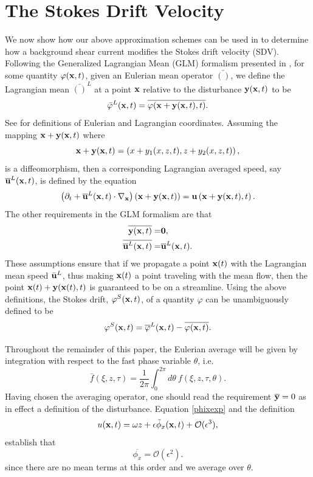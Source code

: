 \documentclass{JFM_Style/jfm}
\newcommand{\pd}{\partial}
\begin{document}
\section{The Stokes Drift Velocity}
We now show how our above approximation schemes can be used in to determine how a background shear current modifies the Stokes drift velocity (SDV). Following the Generalized Lagrangian Mean (GLM) formalism presented in \cite{andrews}, for some quantity $\varphi({\bf x},t)$, given an
Eulerian mean operator $\bar{()}$, we define the Lagrangian mean $\bar{()}^{L}$ at a point ${\bf x}$ relative to the disturbance ${\bf y}({\bf x},t)$ to be  
\[
\bar{\varphi}^{L}({\bf x},t) = \overline{\varphi({\bf x}+{\bf y}({\bf x},t),t)}.
\]
See \cite{kundu} for definitions of Eulerian and Lagrangian coordinates.  Assuming the mapping ${\bf x} + {\bf y}({\bf x},t)$ where
\[
{\bf x} + {\bf y}({\bf x},t) = \left(x+y_{1}(x,z,t),z+y_{2}(x,z,t)\right),
\]
is a diffeomorphism, then a corresponding Lagrangian averaged speed, say $\overline{{\bf u}}^{L}({\bf x},t)$, is defined by the equation
\begin{equation}
\left(\pd_{t} + \overline{{\bf u}}^{L}({\bf x},t)\cdot \nabla_{{\bf x}} \right) \left({\bf x} + {\bf y}({\bf x},t)\right) = {\bf u}\left({\bf x} + {\bf y}({\bf x},t),t\right).
\label{speeddef}
\end{equation}
The other requirements in the GLM formalism are that 
\begin{align*}
\overline{{\bf y}({\bf x},t)} = & \bf{0}, \\
\overline{\overline{{\bf u}}^{L}({\bf x},t)} = & \overline{{\bf u}}^{L}({\bf x},t).
\end{align*}
These assumptions ensure that if we propagate a point ${\bf x}(t)$ with the Lagrangian mean speed $\bar{{\bf u}}^{L}$, thus making ${\bf x}(t)$ a point traveling with the mean flow, then the point ${\bf x}(t) + {\bf y}({\bf x}(t),t)$ is guaranteed to be on a streamline.  Using the above definitions, the Stokes drift, $\varphi^{S}({\bf x},t)$, of a quantity $\varphi$ can be unambiguously defined to be 
\[
\varphi^{S}({\bf x},t) = \overline{\varphi}^{L}({\bf x},t) - \overline{\varphi({\bf x},t)}. 
\]

Throughout the remainder of this paper, the Eulerian average will be given by integration with respect to the fast phase variable $\theta$, i.e.  
\[
\bar{f}(\xi,z,\tau) = \frac{1}{2\pi}\int_{0}^{2\pi} d\theta~ f(\xi,z,\tau,\theta).
\]
Having chosen the averaging operator, one should read the requirement $\overline{{\bf y}}=0$ as in effect a definition of the disturbance.  Equation \eqref{phixexp} and the definition
\[
u({\bf x},t) = \omega z + \epsilon \tilde{\phi}_{x}({\bf x},t) + \mathcal{O}(\epsilon^{3}), 
\]
establish that 
\[
\overline{\phi_{x}}= \mathcal{O}(\epsilon^{2}). 
\]
since there are no mean terms at this order and we average over $\theta$.
\end{document}
